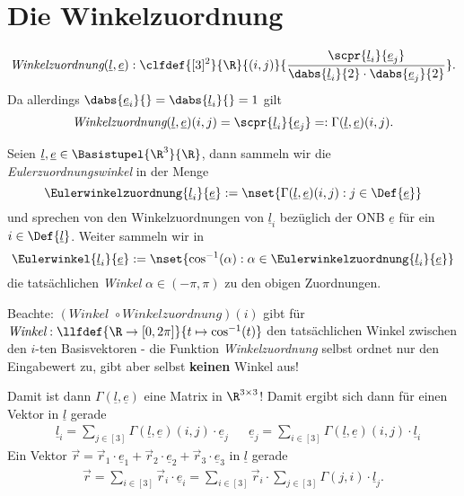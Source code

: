 \documentclass[../WiSe22ANA3.tex]{subfiles}
\begin{document}
	\section{Die Winkelzuordnung}
		\begin{align*}
			\textit{Winkelzuordnung}(\underline l,\underline e):\clfdef{[3]^2}{\R}{(i,j)}{\frac{\scpr{\underline l_i}{\underline e_j}}{\dabs{\underline l_i}{2}\cdot\dabs{\underline e_j}{2}}}. 
		\end{align*}
		Da allerdings $\dabs{\underline e_i}{}=\dabs{\underline l_i}{}=1$ gilt 
		\begin{align*}
			\textit{Winkelzuordnung}(\underline l,\underline e)(i,j)=\scpr{\underline l_i}{\underline e_j}=:\Gamma(\underline l,\underline e)(i,j). 
		\end{align*}
		\begin{info}
			Seien $\underline l,\underline e\in\Basistupel{\R^3}{\R}$, dann sammeln wir die \emph{Eulerzuordnungswinkel} in der Menge
			$$\Eulerwinkelzuordnung{\underline l_i}{\underline e}:=\nset{\Gamma(\underline l,\underline e)(i,j):j\in\Def{\underline e}}$$
			und sprechen von den Winkelzuordnungen von $\underline l_i$ bezüglich der ONB $\underline e$ für ein $i\in\Def{\underline l}$. Weiter sammeln wir in 
			$$\Eulerwinkel{\underline l_i}{\underline e}:=\nset{\cos^{-1}(\alpha):\alpha\in\Eulerwinkelzuordnung{\underline l_i}{\underline e}}$$
			die tatsächlichen \emph{Winkel} $\alpha\in(-\pi,\pi)$ zu den obigen Zuordnungen. 
		\end{info}
		\begin{Bemerkung}
			Beachte: $(\textit{Winkel }\circ\textit{Winkelzuordnung})(i)$ gibt für $\textit{Winkel}:\llfdef{\R\to[0,2\pi]}{t\mapsto \cos^{-1}(t)}$ den tatsächlichen Winkel zwischen den $i$-ten Basisvektoren - die Funktion \textit{Winkelzuordnung} selbst ordnet nur den Eingabewert zu, gibt aber selbst \textbf{keinen} Winkel aus!
		\end{Bemerkung}
		Damit ist dann $\Gamma(\underline l,\underline e)$ eine Matrix in $\R^{3\times 3}$! Damit ergibt sich dann für einen Vektor in $\underline l$ gerade
		\begin{align*}
			&\underline l_i=\sum_{j\in[3]}\Gamma(\underline l,\underline e)(i,j)\cdot\underline e_j && \underline e_j=\sum_{i\in[3]}\Gamma(\underline l,\underline e)(i,j)\cdot\underline l_i
		\end{align*} 
		Ein Vektor $\vec r=\vec r_1\cdot\underline e_1+\vec r_2\cdot\underline e_2+\vec r_3\cdot\underline e_3$ in $\underline l$ gerade
		\begin{align*}
			\vec r=\sum_{i\in[3]}\vec r_i\cdot \underline e_i=\sum_{i\in[3]}\vec r_i\cdot \sum_{j\in[3]}\Gamma(j,i)\cdot\underline l_j.
		\end{align*}
\end{document}
